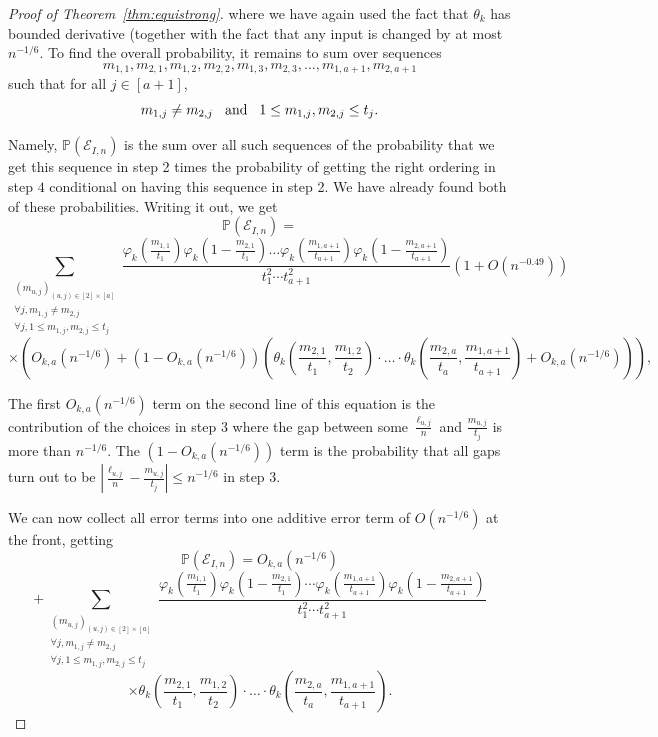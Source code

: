 \documentclass{amsart}
\theoremstyle{definition}
\begin{document}
\begin{proof}[Proof of Theorem~\ref{thm:equistrong}]
where we have again used the fact that $\theta_k$ has bounded derivative (together with the fact that any input is changed by at most $n^{-1/6}$. To find the overall probability, it remains to sum over sequences \[m_{1,1},m_{2,1},m_{1,2},m_{2,2},m_{1,3},m_{2,3},\ldots, m_{1,a+1},m_{2,a+1}\]
such that for all $j\in [a+1]$,
\[m_{1,j}\neq m_{2,j} \hspace{3mm}\text{and}\hspace{3mm}1\leq m_{1,j},m_{2,j}\leq t_j.\]

Namely, $\mathbb{P}\left(\mathcal{E}_{I,n}\right)$ is the sum over all such sequences of the probability that we get this sequence in step 2 times the probability of getting the right ordering in step $4$ conditional on having this sequence in step 2. We have already found both of these probabilities. Writing it out, we get 
\[\mathbb{P}\left(\mathcal{E}_{I,n}\right)=\]\[\sum_{\substack{(m_{u,j})_{(u,j)\in [2]\times [a]}\\ \forall j, m_{1,j}\neq m_{2,j}\\ \forall j, 1\leq m_{1,j},m_{2,j}\leq t_j}}\frac{\varphi_k\left(\frac{m_{1,1}}{t_1}\right)\varphi_k\left(1-\frac{m_{2,1}}{t_1}\right)\ldots\varphi_k\left(\frac{m_{1,a+1}}{t_{a+1}}\right)\varphi_k\left(1-\frac{m_{2,a+1}}{t_{a+1}}\right)}{t_1^2\cdots t_{a+1}^2}\left(1+O\left(n^{-0.49}\right)\right)\]
\[\times \left(O_{k,a}\left(n^{-1/6}\right)+\left(1-O_{k,a}\left(n^{-1/6}\right)\right)\left(\theta_k\left(\frac{m_{2,1}}{t_1},\frac{m_{1,2}}{t_2}\right)\cdot \ldots \cdot \theta_k\left(\frac{m_{2,a}}{t_a},\frac{m_{1,a+1}}{t_{a+1}}\right)+O_{k,a}\left(n^{-1/6}\right)\right)\right),\]

The first $O_{k,a}\left(n^{-1/6}\right)$ term on the second line of this equation is the contribution of the choices in step $3$ where the gap between some $\frac{\ell_{u,j}}{n}$ and $\frac{m_{u,j}}{t_j}$ is more than $n^{-1/6}$. The $\left(1-O_{k,a}\left(n^{-1/6}\right)\right)$ term is the probability that all gaps turn out to be $\left\lvert\frac{\ell_{u,j}}{n}-\frac{m_{u,j}}{t_j}\right\rvert\leq n^{-1/6}$ in step $3$.

We can now collect all error terms into one additive error term of $O\left(n^{-1/6}\right)$ at the front, getting
\[\mathbb{P}\left(\mathcal{E}_{I,n}\right)=O_{k,a}\left(n^{-1/6}\right)\]\[+\sum_{\substack{(m_{u,j})_{(u,j)\in [2]\times [a]}\\ \forall j, m_{1,j}\neq m_{2,j}\\ \forall j, 1\leq m_{1,j},m_{2,j}\leq t_j}}\frac{\varphi_k\left(\frac{m_{1,1}}{t_1}\right)\varphi_k\left(1-\frac{m_{2,1}}{t_1}\right)\cdots\varphi_k\left(\frac{m_{1,a+1}}{t_{a+1}}\right)\varphi_k\left(1-\frac{m_{2,a+1}}{t_{a+1}}\right)}{t_1^2\cdots t_{a+1}^2}\]
\[\times\theta_k\left(\frac{m_{2,1}}{t_1},\frac{m_{1,2}}{t_2}\right)\cdot \ldots \cdot \theta_k\left(\frac{m_{2,a}}{t_a},\frac{m_{1,a+1}}{t_{a+1}}\right).\]


\end{proof}
\end{document}
